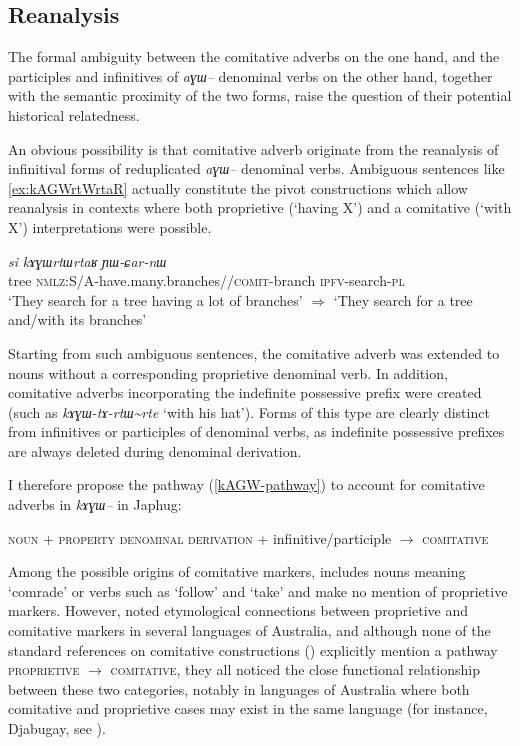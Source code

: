 \documentclass[oldfontcommands,oneside,a4paper,11pt]{article}
\newcommand{\ipa}[1]{{\phon\textit{#1}}} %
\newcommand{\tld}{\textasciitilde{}}
\begin{document}
\subsection{Reanalysis}
The formal ambiguity between the comitative adverbs on the one hand, and the participles and infinitives of \ipa{aɣɯ--} denominal verbs on the other hand, together with the semantic proximity of the two forms, raise the question of their potential historical relatedness.

An obvious possibility is that comitative adverb originate from the reanalysis of infinitival forms of reduplicated \ipa{aɣɯ--} denominal verbs. Ambiguous sentences like \ref{ex:kAGWrtWrtaR} actually constitute the pivot constructions which allow reanalysis in contexts where both proprietive (`having X') and a comitative (`with X') interpretations were possible.


  \begin{exe}
\ex \label{ex:kAGWrtWrtaR2}
\gll   
  \ipa{si} 	\ipa{kɤɣɯrtɯrtaʁ} \ipa{ɲɯ-ɕar-nɯ} \\
  tree \textsc{nmlz}:S/A-have.many.branches//\textsc{comit}-branch \textsc{ipfv}-search-\textsc{pl} \\
\glt `They search for a tree having a lot of branches' $\Rightarrow$ `They search for a tree and/with its branches'
\end{exe}

Starting from such ambiguous sentences, the comitative adverb was extended to nouns without a corresponding proprietive denominal verb. In addition, comitative adverbs incorporating the indefinite possessive prefix were created (such as \ipa{kɤɣɯ-tɤ-rtɯ\tld{}rte} `with his hat'). Forms of this type are clearly distinct from infinitives or participles of denominal verbs, as indefinite possessive prefixes are always deleted during  denominal derivation.


I therefore propose the pathway (\ref{kAGW-pathway}) to account for comitative adverbs in \ipa{kɤɣɯ--} in Japhug:

 \begin{exe}
\ex \label{kAGW-pathway}
 \glt  \textsc{noun} + \textsc{property denominal derivation} + infinitive/participle $\rightarrow$ \textsc{comitative}
\end{exe} 

Among the possible origins of comitative markers,  \citet[91, 139, 287]{heine-kuteva02} includes nouns meaning `comrade' or verbs such as `follow' and `take' and make no mention of proprietive markers. However, \citet{sutton76having} noted etymological connections between proprietive and comitative markers in several languages of Australia, and although none of the standard references on comitative constructions (\citealt{stassen00and, stolz06comitative, arkhipov09comitative}) explicitly mention a pathway \textsc{proprietive} $\rightarrow$ \textsc{comitative}, they all noticed the close functional relationship between these two categories, notably in languages of Australia where both comitative and proprietive cases may exist in the same language (for instance, Djabugay, see \citealt{patz91djabugay}).
 
\end{document}

